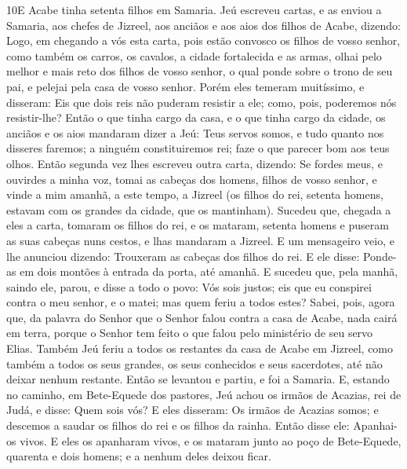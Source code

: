 \medskip

\lettrine{10} E Acabe tinha setenta filhos em Samaria. Jeú
escreveu cartas, e as enviou a Samaria, aos chefes de Jizreel, aos
anciãos e aos aios dos filhos de Acabe, dizendo: Logo, em
chegando a vós esta carta, pois estão convosco os filhos de vosso
senhor, como também os carros, os cavalos, a cidade fortalecida e as
armas, olhai pelo melhor e mais reto dos filhos de vosso senhor,
o qual ponde sobre o trono de seu pai, e pelejai pela casa de vosso
senhor. Porém eles temeram muitíssimo, e disseram: Eis que dois
reis não puderam resistir a ele; como, pois, poderemos nós
resistir-lhe? Então o que tinha cargo da casa, e o que tinha
cargo da cidade, os anciãos e os aios mandaram dizer a Jeú: Teus
servos somos, e tudo quanto nos disseres faremos; a ninguém
constituiremos rei; faze o que parecer bom aos teus olhos. Então
segunda vez lhes escreveu outra carta, dizendo: Se fordes meus, e
ouvirdes a minha voz, tomai as cabeças dos homens, filhos de vosso
senhor, e vinde a mim amanhã, a este tempo, a Jizreel (os filhos do
rei, setenta homens, estavam com os grandes da cidade, que os
mantinham). Sucedeu que, chegada a eles a carta, tomaram os
filhos do rei, e os mataram, setenta homens e puseram as suas
cabeças nuns cestos, e lhas mandaram a Jizreel. E um mensageiro
veio, e lhe anunciou dizendo: Trouxeram as cabeças dos filhos do
rei. E ele disse: Ponde-as em dois montões à entrada da porta, até
amanhã. E sucedeu que, pela manhã, saindo ele, parou, e disse a
todo o povo: Vós sois justos; eis que eu conspirei contra o meu
senhor, e o matei; mas quem feriu a todos estes? Sabei, pois,
agora que, da palavra do Senhor que o Senhor falou contra a casa de
Acabe, nada cairá em terra, porque o Senhor tem feito o que falou
pelo ministério de seu servo Elias. Também Jeú feriu a todos
os restantes da casa de Acabe em Jizreel, como também a todos os
seus grandes, os seus conhecidos e seus sacerdotes, até não deixar
nenhum restante. Então se levantou e partiu, e foi a Samaria.
E, estando no caminho, em Bete-Equede dos pastores, Jeú achou
os irmãos de Acazias, rei de Judá, e disse: Quem sois vós? E eles
disseram: Os irmãos de Acazias somos; e descemos a saudar os filhos
do rei e os filhos da rainha. Então disse ele: Apanhai-os
vivos. E eles os apanharam vivos, e os mataram junto ao poço de
Bete-Equede, quarenta e dois homens; e a nenhum deles deixou ficar.

